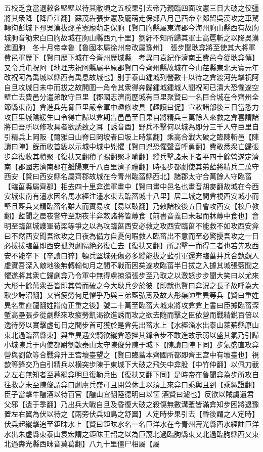 五校乏食當退敕各堅壁以待其敝頃之五校果引去帝乃親臨四面攻憲三日大破之佼彊將其衆降【降戶江翻】蘇茂犇張步憲及龐萌走保郯八月己酉帝幸郯留吳漢攻之車駕轉徇彭城下邳吳漢拔郯董憲龐萌走保朐【賢曰朐縣屬東海郡今海州朐山縣西有故朐城朐音劬宋白曰朐故城在朐山縣西九十里】劉紆不知所歸其軍士高扈斬之以降吳漢進圍朐　冬十月帝幸魯【魯國本屬徐州帝改屬豫州】　張步聞耿弇將至使其大將軍費邑軍歷下【賢曰歷下城在今齊州歷城縣　考異曰袁紀作濟南王費邑今從耿弇傳】又令兵屯祝阿【地理志祝阿縣屬平原郡賢曰今齊州縣故城在今山荏縣東北天寶元年改祝阿為禹城以縣西有禹息故城也】别于泰山鍾城列營數十以待之弇渡河先擊祝阿自旦攻城日未中而拔之故開圍一角令其衆得奔歸鍾城鍾城人聞祝阿已潰大恐懼遂空壁亡去費邑分遣弟敢守巨里【郡國志濟南歷城有巨里聚賢曰一名巨合城在今齊州全節縣東南】弇進兵先脅巨里嚴令軍中趣修攻具【趣讀曰促】宣敕諸部後三日當悉力攻巨里城隂緩生口令得亡歸以弇期告邑邑至日果自將精兵三萬餘人來救之弇喜謂諸將曰吾所以修攻具者欲誘致之耳【誘音酉】野兵不擊何以城為即分三千人守巨里自引精兵上岡阪【爾雅曰山脊曰岡坡者曰坂上時掌翻】乘高合戰大破之臨陳斬邑【陳讀曰陣】旣而收首級以示城中城中兇懼【賢曰兇恐懼聲音呼勇翻】費敢悉衆亡歸張步弇復收其積聚【復扶又翻積子賜翻聚才喻翻】縱兵擊諸未下者平四十餘營遂定濟南【郡國志濟南郡在雒陽東千八百里濟子禮翻】時張步都劇使其弟藍將精兵二萬守西安【賢曰西安縣名屬齊郡故城在今青州臨菑縣西北】諸郡太守合萬餘人守臨菑【臨菑縣屬齊郡】相去四十里弇進軍畫中【賢曰畫中邑名也畫音胡麥翻故城在今西安城東南有澅水因名馬水經注澅水東去臨菑城十八里】居二城之間弇視西安城小而堅且藍兵又精臨菑名雖大而實易攻【易以䜴翻】乃敕諸校後五日會攻西安【校戶教翻】藍聞之晨夜警守至期夜半弇敕諸將皆蓐食【前書音義曰未起而牀蓐中食也】會明至臨菑城護軍荀梁等爭之以為攻臨菑西安必救之攻西安臨菑不能救不如攻西安弇曰不然西安聞吾欲攻之日夜為備方自憂何暇救人臨菑出不意而至必驚擾吾攻之一日必拔拔臨菑即西安孤與劇隔絶必復亡去【復扶又翻】所謂擊一而得二者也若先攻西安不能卒下【卒讀曰猝】頓兵堅城死傷必多縱能拔之藍引軍還奔臨菑并兵合埶觀人虛實吾深入敵地後無轉輸旬月之間不戰而困矣遂攻臨菑半日拔之入據其城張藍聞之懼遂將其衆亡歸劇弇乃令軍中無得虜掠須張步至乃取之以激怒步步聞大笑曰以尤來大彤十餘萬衆吾皆即其營而破之今大耿兵少於彼【即就也賢曰弇況之長子故呼為大耿少詩沼翻】又皆疲勞何足懼乎乃與三弟藍弘夀及故大彤渠帥重異等兵【賢曰重姓異名重直龍翻姓譜南正重之後】號二十萬至臨菑大城東將攻弇弇上書曰臣據臨菑深塹高壘張步從劇縣來攻疲勞飢渇欲進誘而攻之欲去隨而擊之臣依營而戰精鋭百倍以逸待勞以實擊虚旬日之間步首可獲於是弇先出菑水上【水經淄水出泰山萊蕪縣原山東北過臨菑縣東】與重異遇突騎欲縱弇恐挫其鋒令步不敢進故示弱以盛其氣乃引歸小城陳兵于内使都尉劉歆泰山太守陳俊分陳于城下【陳讀曰陣下同】步氣盛直攻弇營與劉歆等合戰弇升王宫壞臺望之【賢曰臨菑本齊國所都即齊王宫中有壞臺也】視歆等鋒交乃自引精兵以横突步陳于東城下大破之飛矢中弇股【中竹仲翻】以佩刀截之左右無知者至暮罷弇明旦復勒兵出【復扶又翻下同】是時帝在魯聞弇為步所攻自往救之未至陳俊謂弇曰劇虜兵盛可且閉營休士以須上來弇曰乘輿且到【乘繩證翻】臣子當擊牛釃酒以待百官【釃山宜翻陸德明曰以筐酒賢曰濾也】反欲以賊虜遺君父邪【遺于季翻】乃出兵大戰自旦及昏復大破之殺傷無數溝塹皆滿弇知步困將退豫置左右翼為伏以待之【兩旁伏兵如鳥之舒翼】人定時步果引去【昏後謂之人定時】伏兵起縱擊追至鉅昩水上【賢曰鉅昩水名一名巨洋水在今青州壽光縣西水經註巨洋水出朱虚縣東泰山袁宏謂之鉅昧王韶之以為巨蔑北過臨朐縣東又北過臨朐縣西又東北過夀光縣西昩音莫葛翻】八九十里僵尸相屬【屬